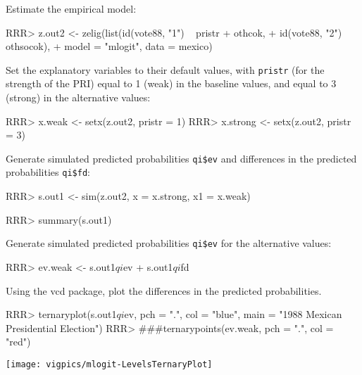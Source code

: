 \begin{enumerate}
Estimate the empirical model:  
\begin{Schunk}
\begin{Sinput}
RRR>  z.out2 <- zelig(list(id(vote88, "1") ~ pristr + othcok,
+                        id(vote88, "2") ~ othsocok), 
+                   model = "mlogit", data = mexico)
\end{Sinput}
\end{Schunk}
Set the explanatory variables to their default values, with {\tt pristr}
(for the strength of the PRI) equal to 1 (weak) in the baseline values, and
equal to 3 (strong) in the alternative values: 
\begin{Schunk}
\begin{Sinput}
RRR>  x.weak <- setx(z.out2, pristr = 1)
RRR>  x.strong <- setx(z.out2, pristr = 3)
\end{Sinput}
\end{Schunk}
Generate simulated predicted probabilities {\tt qi\$ev} and differences in
the predicted probabilities {\tt qi\$fd}:
\begin{Schunk}
\begin{Sinput}
RRR>  s.out1 <- sim(z.out2, x = x.strong, x1 = x.weak)
\end{Sinput}
\end{Schunk}
\begin{Schunk}
\begin{Sinput}
RRR>  summary(s.out1)
\end{Sinput}
\end{Schunk}
Generate simulated predicted probabilities {\tt qi\$ev} for the
alternative values:  
\begin{Schunk}
\begin{Sinput}
RRR>  ev.weak <- s.out1$qi$ev + s.out1$qi$fd
\end{Sinput}
\end{Schunk}
Using the vcd package, plot the differences in the predicted probabilities.
\begin{center}
\begin{Schunk}
\begin{Sinput}
RRR> ternaryplot(s.out1$qi$ev, pch = ".", col = "blue", main = "1988 Mexican Presidential Election")
RRR> ###ternarypoints(ev.weak, pch = ".", col = "red")
\end{Sinput}
\end{Schunk}
\texttt{[image: vigpics/mlogit-LevelsTernaryPlot]}
\end{center} 

 
\end{enumerate}

